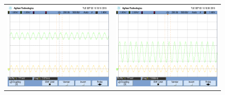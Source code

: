 \begin{figure}[H]
    \centering
    \begin{tabular}{c c}
        \includegraphics[scale=0.2]{../EJ5/Mediciones/Osciloscopio/Senoide_3600_Medio/scope_13.png} &
        \includegraphics[scale=0.2]{../EJ5/Mediciones/Osciloscopio/Senoide_3600_Medio/scope_14.png} \\

\end{tabular}
\end{figure}
